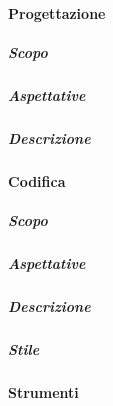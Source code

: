 \documentclass[../norme-di-progetto.tex]{subfiles}
\begin{document}
\paragraph{Progettazione}
\subparagraph{Scopo}
\subparagraph{Aspettative}
\subparagraph{Descrizione}

\paragraph{Codifica}
\subparagraph{Scopo}
\subparagraph{Aspettative}
\subparagraph{Descrizione}
\subparagraph{Stile}

\paragraph{Strumenti}

\newpage
\end{document}
